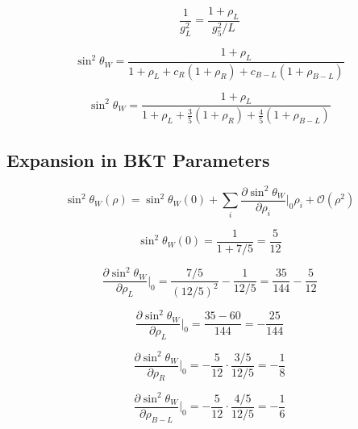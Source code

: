 \documentclass[11pt,a4paper]{article}
\theoremstyle{definition}
\begin{document}
\begin{equation}
\label{eq:sw2_gen_3}
\frac{1}{g_L^2} = \frac{1 + \rho_L}{g_5^2/L}
\end{equation}

\begin{equation}
\label{eq:sw2_gen_4}
\sin^2\theta_W = \frac{1 + \rho_L}{1 + \rho_L + c_R(1 + \rho_R) + c_{B-L}(1 + \rho_{B-L})}
\end{equation}

\begin{equation}
\label{eq:sw2_gen_5}
\sin^2\theta_W = \frac{1 + \rho_L}{1 + \rho_L + \frac{3}{5}(1 + \rho_R) + \frac{4}{5}(1 + \rho_{B-L})}
\end{equation}

\subsection{Expansion in BKT Parameters}
\label{subsec:sw2_expansion}

\begin{equation}
\label{eq:sw2_exp_1}
\sin^2\theta_W(\rho) = \sin^2\theta_W(0) + \sum_i \frac{\partial \sin^2\theta_W}{\partial \rho_i}\Big|_0 \rho_i + \mathcal{O}(\rho^2)
\end{equation}

\begin{equation}
\label{eq:sw2_exp_2}
\sin^2\theta_W(0) = \frac{1}{1 + 7/5} = \frac{5}{12}
\end{equation}

\begin{equation}
\label{eq:sw2_exp_3}
\frac{\partial \sin^2\theta_W}{\partial \rho_L}\Big|_0 = \frac{7/5}{(12/5)^2} - \frac{1}{12/5} = \frac{35}{144} - \frac{5}{12}
\end{equation}

\begin{equation}
\label{eq:sw2_exp_4}
\frac{\partial \sin^2\theta_W}{\partial \rho_L}\Big|_0 = \frac{35 - 60}{144} = -\frac{25}{144}
\end{equation}

\begin{equation}
\label{eq:sw2_exp_5}
\frac{\partial \sin^2\theta_W}{\partial \rho_R}\Big|_0 = -\frac{5}{12}\cdot\frac{3/5}{12/5} = -\frac{1}{8}
\end{equation}

\begin{equation}
\label{eq:sw2_exp_6}
\frac{\partial \sin^2\theta_W}{\partial \rho_{B-L}}\Big|_0 = -\frac{5}{12}\cdot\frac{4/5}{12/5} = -\frac{1}{6}
\end{equation}
\end{document}
